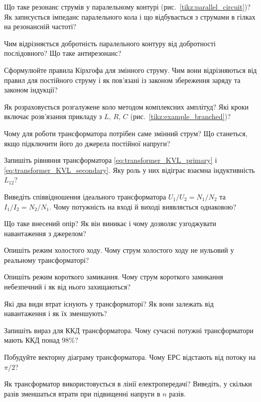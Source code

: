 \begin{Questions}
\begin{quizlist}
	\item Що таке резонанс струмів у паралельному контурі (рис.~\ref{tikz:parallel_circuit})? Як записується імпеданс паралельного кола і що відбувається з струмами в гілках на резонансній частоті?
	\item Чим відрізняється добротність паралельного контуру від добротності послідовного? Що таке антирезонанс?
	\item Сформулюйте правила Кірхгофа для змінного струму. Чим вони відрізняються від правил для постійного струму і як пов'язані із законом збереження заряду та законом індукції?
	\item Як розраховується розгалужене коло методом комплексних амплітуд? Які кроки включає розв'язання прикладу з $L$, $R$, $C$ (рис.~\ref{tikz:example_branched})?
	\item Чому для роботи трансформатора потрібен саме змінний струм? Що станеться, якщо підключити його до джерела постійної напруги?
	\item Запишіть рівняння трансформатора \eqref{eq:transformer_KVL_primary} і \eqref{eq:transformer_KVL_secondary}. Яку роль у них відіграє взаємна індуктивність $L_{12}$?
	\item Виведіть співвідношення ідеального трансформатора $U_1/U_2 = N_1/N_2$ та $I_1/I_2 = N_2/N_1$. Чому потужність на вході й виході виявляється однаковою?
	\item Що таке внесений опір? Як він виникає і чому дозволяє узгоджувати навантаження з джерелом?
	\item Опишіть режим холостого ходу. Чому струм холостого ходу не нульовий у реальному трансформаторі?
	\item Опишіть режим короткого замикання. Чому струм короткого замикання небезпечний і як від нього захищаються?
	\item Які два види втрат існують у трансформаторі? Як вони залежать від навантаження і як їх зменшують?
	\item Запишіть вираз для ККД трансформатора. Чому сучасні потужні трансформатори мають ККД понад $98\%$?
	\item Побудуйте векторну діаграму трансформатора. Чому ЕРС відстають від потоку на $\pi/2$?
	\item Як трансформатор використовується в лінії електропередачі? Виведіть, у скільки разів зменшаться втрати при підвищенні напруги в $n$ разів.

\end{quizlist}
\end{Questions}
